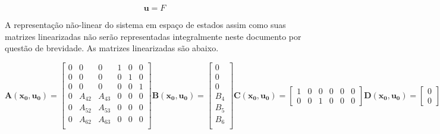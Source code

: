 \documentclass[a4paper, twoside, fleqn]{article}
\begin{document}
    \begin{equation}
    \mathbf{u} = F
    \label{eq:input}
    \end{equation}
    
    A representação não-linear do sistema em espaço de estados assim como suas matrizes linearizadas não serão representadas integralmente neste documento por questão de brevidade. As matrizes linearizadas são abaixo.
    
    \begin{subequations}
    \begin{equation}
        \mathbf{A}(\mathbf{x_0}, \mathbf{u_0}) = 
        \begin{bmatrix}
        0 & 0 & 0 & 1 & 0 & 0 \\
        0 & 0 & 0 & 0 & 1 & 0 \\
        0 & 0 & 0 & 0 & 0 & 1 \\
        0 & A_{42} & A_{43} & 0 & 0 & 0 \\
        0 & A_{52} & A_{53} & 0 & 0 & 0 \\
        0 & A_{62} & A_{63} & 0 & 0 & 0 \\
        \end{bmatrix}
    \end{equation}
    \begin{equation}
        \mathbf{B}(\mathbf{x_0}, \mathbf{u_0}) = 
        \begin{bmatrix}
        0 \\
        0 \\
        0 \\
        B_4 \\
        B_5 \\
        B_6 \\
        \end{bmatrix}
    \end{equation}
        \begin{equation}
        \mathbf{C}(\mathbf{x_0}, \mathbf{u_0}) = 
        \begin{bmatrix}
        1 & 0 & 0 & 0 & 0 & 0\\
        0 & 0 & 1 & 0 & 0 & 0
        \end{bmatrix}
    \end{equation}
        \begin{equation}
        \mathbf{D}(\mathbf{x_0}, \mathbf{u_0}) = 
        \begin{bmatrix}
        0 \\
        0
        \end{bmatrix}
    \end{equation}
    \end{subequations}
    
    \clearpage
    \printbibliography
\end{document}
